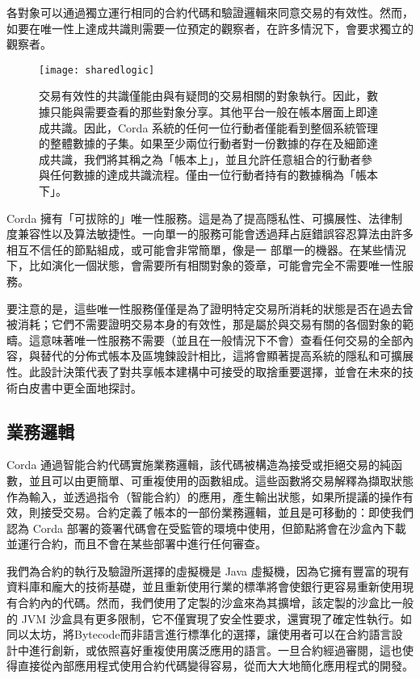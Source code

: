 ﻿\documentclass{article}
\begin{document}
各對象可以通過獨立運行相同的合約代碼和驗證邏輯來同意交易的有效性。然而，如要在唯一性上達成共識則需要一位預定的觀察者，在許多情況下，會要求獨立的觀察者。

\begin{figure}[H]
    \texttt{[image: sharedlogic]}
    \caption{交易有效性的共識僅能由與有疑問的交易相關的對象執行。因此，數據只能與需要查看的那些對象分享。其他平台一般在帳本層面上即達成共識。因此，Corda 系統的任何一位行動者僅能看到整個系統管理的整體數據的子集。如果至少兩位行動者對一份數據的存在及細節達成共識，我們將其稱之為「帳本上」，並且允許任意組合的行動者參與任何數據的達成共識流程。僅由一位行動者持有的數據稱為「帳本下」。}
\end{figure}

Corda 擁有「可拔除的」唯一性服務。這是為了提高隱私性、可擴展性、法律制度兼容性\cite{EUC}以及算法敏捷性。一向單一的服務可能會透過拜占庭錯誤容忍算法由許多相互不信任的節點組成，或可能會非常簡單，像是一 部單一的機器。在某些情況下，比如演化一個狀態，會需要所有相關對象的簽章，可能會完全不需要唯一性服務。 

要注意的是，這些唯一性服務僅僅是為了證明特定交易所消耗的狀態是否在過去曾被消耗；它們不需要證明交易本身的有效性，那是屬於與交易有關的各個對象的範疇。這意味著唯一性服務不需要（並且在一般情況下不會）查看任何交易的全部內容，與替代的分佈式帳本及區塊鍊設計相比，這將會顯著提高系統的隱私和可擴展性。此設計決策代表了對共享帳本建構中可接受的取捨重要選擇，並會在未來的技術白皮書中更全面地探討。

\subsection{業務邏輯}
Corda 通過智能合約代碼實施業務邏輯，該代碼被構造為接受或拒絕交易的純函數，並且可以由更簡單、可重複使用的函數組成。這些函數將交易解釋為擷取狀態作為輸入，並透過指令（智能合約）的應用，產生輸出狀態，如果所提議的操作有效，則接受交易。合約定義了帳本的一部份業務邏輯，並且是可移動的：即使我們認為 Corda 部署的簽署代碼會在受監管的環境中使用，但節點將會在沙盒內下載並運行合約，而且不會在某些部署中進行任何審查。 

我們為合約的執行及驗證所選擇的虛擬機是 Java 虛擬機\cite{JVM}，因為它擁有豐富的現有資料庫和龐大的技術基礎，並且重新使用行業的標準將會使銀行更容易重新使用現有合約內的代碼。然而，我們使用了定製的沙盒來為其擴增，該定製的沙盒比一般的 JVM 沙盒具有更多限制，它不僅實現了安全性要求，還實現了確定性執行。如同以太坊\cite{以太坊}，將Bytecode而非語言進行標準化的選擇，讓使用者可以在合約語言設計中進行創新，或依照喜好重複使用廣泛應用的語言。一旦合約經過審閱，這也使得直接從內部應用程式使用合約代碼變得容易，從而大大地簡化應用程式的開發。
\end{document}

